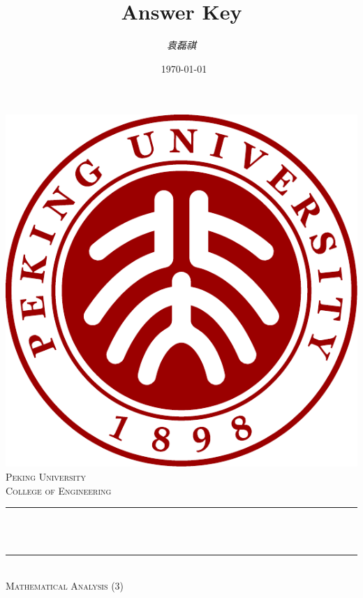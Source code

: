 \documentclass[11pt,UTF8]{article}
\title{Answer Key}								%
\author{\emph{袁磊祺}}								%
\date{\ \today}											%
\makeatletter
\let\athetitle\@title
\let\theauthor\@author
\let\thedate\@date
\makeatother
\begin{document}
% 

\begin{titlepage}
	\centering
    \vspace*{-0.5 cm}
    \includegraphics[scale = 0.5]{fig/pkured.pdf}\\[1.0 cm]	%
    \textsc{\LARGE Peking University}\\[2.0 cm]	%
	\textsc{\Large College of Engineering}\\[0.7 cm]				%
	
	\rule{\linewidth}{0.5 mm} \\[0.8 cm]
	{ \huge \bfseries \athetitle}\\[0.4 cm]
	\rule{\linewidth}{0.5 mm} \\[1 cm]
	\textsc{\large Mathematical Analysis (3)}\\[4 cm]				%
	\centering
		\large
		\href{mailto:circlelq@pku.edu.cn}{\faEnvelope}\quad \theauthor\\[0.5 cm]
		\thedate\\[2 cm]
	 
\end{titlepage}


{
  \hypersetup{linkcolor=black}
  \tableofcontents
}
\pagebreak
\end{document}
